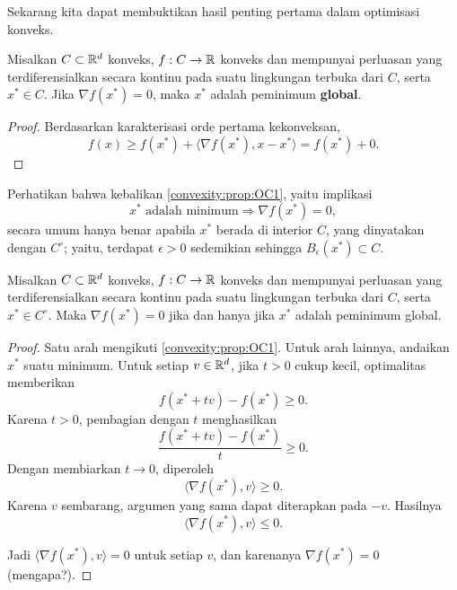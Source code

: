 Sekarang kita dapat membuktikan hasil penting pertama dalam optimisasi konveks.
\begin{prop}\label{convexity:prop:OC1}
    Misalkan $C\subset\mathbb{R}^d$ konveks, $f:C\rightarrow\mathbb{R}$ konveks dan mempunyai
    perluasan yang terdiferensialkan secara kontinu pada suatu lingkungan
    terbuka dari $C$, serta $x^*\in C$. Jika $\nabla f(x^*)=0$, maka $x^*$
    adalah peminimum \textbf{global}.
\end{prop}
\begin{proof}
    Berdasarkan karakterisasi orde pertama kekonveksan,
    \begin{equation}
        f(x)\geq f(x^*)+\langle\nabla f(x^*),x-x^*\rangle
        =f(x^*)+0.
    \end{equation}
\end{proof}

Perhatikan bahwa kebalikan \cref{convexity:prop:OC1}, yaitu implikasi
\begin{equation}
    \text{$x^*$ adalah minimum}\Rightarrow\nabla f(x^*)=0,
\end{equation}
secara umum hanya benar apabila $x^*$ berada di interior $C$, yang dinyatakan dengan $C^\circ$; yaitu, terdapat $\epsilon>0$ sedemikian sehingga $B_\epsilon(x^*)\subset C$.

\begin{theorem}
    Misalkan $C\subset\mathbb{R}^d$ konveks, $f:C\rightarrow\mathbb{R}$ konveks dan mempunyai
    perluasan yang terdiferensialkan secara kontinu pada suatu lingkungan
    terbuka dari $C$, serta $x^*\in C^\circ$. Maka $\nabla f(x^*)=0$ jika dan
    hanya jika $x^*$ adalah peminimum global.
\end{theorem}
\begin{proof}
    Satu arah mengikuti \cref{convexity:prop:OC1}. Untuk arah lainnya, andaikan $x^*$ suatu minimum. Untuk setiap $v\in\mathbb{R}^d$, jika $t>0$ cukup kecil, optimalitas memberikan
    \begin{equation}
        f(x^*+tv)-f(x^*)\geq0.
    \end{equation}
    Karena $t>0$, pembagian dengan $t$ menghasilkan
    \begin{equation}
        \frac{f(x^*+tv)-f(x^*)}{t}\geq0.
    \end{equation}
    Dengan membiarkan $t\rightarrow0$, diperoleh
    \begin{equation}
        \langle\nabla f(x^*),v\rangle\geq0.
    \end{equation}
    Karena $v$ sembarang, argumen yang sama dapat diterapkan pada $-v$. Hasilnya
    \[
        \langle\nabla f(x^*),v\rangle\leq0.
    \]

    Jadi $\langle\nabla f(x^*),v\rangle=0$ untuk setiap $v$, dan karenanya
    $\nabla f(x^*)=0$ (mengapa?).
\end{proof}

